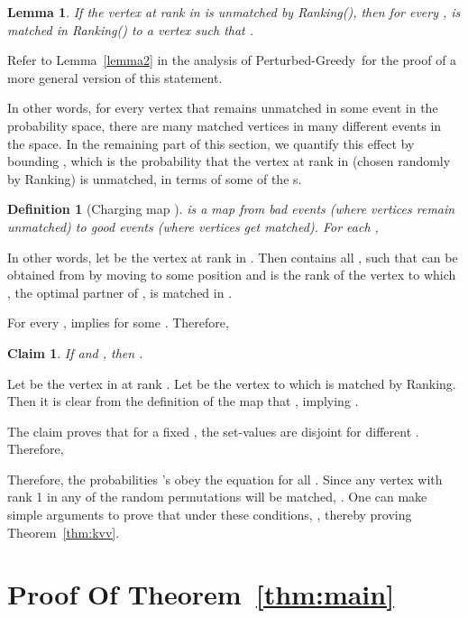 \documentclass[11pt]{article}
\newtheorem{definition}{Definition}
\newtheorem{claim}{Claim}
\newtheorem{lemma}[theorem]{Lemma}
\newcommand{\qed}{}
\newcommand{\pgreedy}{{\sc Perturbed-Greedy}}
\newenvironment{proof}{\noindent{\em Proof:}}{\hfill \qed \medskip}
\begin{document}
\begin{lemma}
\label{lemma1}
If the vertex  at rank  in  is unmatched by {\sc
  Ranking}(), then for every ,  is matched in
{\sc Ranking}() to a vertex  such that .
\end{lemma}
\begin{proof}
Refer to Lemma~\ref{lemma2} in the analysis of
\pgreedy~for the proof of a more general version of this statement.
\end{proof}

In other words, for every vertex that remains unmatched in some event
in the probability space, there are many matched vertices in many
different events in the space. In the remaining part of this section,
we quantify this effect by bounding , which is the probability
that the vertex at rank  in  (chosen randomly by {\sc
  Ranking}) is unmatched, in terms of some of the s.


\begin{definition}[Charging map ]
 is a map from bad events (where vertices remain unmatched) to good
  events (where vertices get matched).  For each , 
\end{definition}

In other words, let  be the vertex at rank  in . Then
 contains all , such that  can be
obtained from  by moving  to some position and  is the
rank of the vertex to which , the optimal partner of , is
matched in .

For every ,  implies
 for some . Therefore, 

\begin{claim}
\label{claim1}
If  and , then .
\end{claim}
\begin{proof}
Let  be the vertex in  at rank . Let  be the vertex
to which  is matched by {\sc Ranking}. Then it is clear
from the definition of the map  that , implying .
\end{proof}

The claim proves that for a fixed , the set-values  are disjoint for different . Therefore, 


Therefore, the probabilities 's obey the equation
 for all . Since any vertex with
rank 1 in any of the random permutations will be matched, . One can make simple arguments \cite{KVV90, BM08, GM08} to prove that
under these conditions, ,
thereby proving Theorem~\ref{thm:kvv}.


\section{Proof Of Theorem~\ref{thm:main}}
\label{sec:main-proof}
\end{document}
